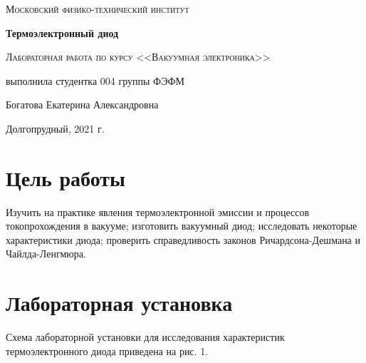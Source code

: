 \documentclass[a4paper]{article}
\begin{document}
\begin{titlepage}
	\centering
	\vspace{5cm}
	{\scshape\LARGE Московский физико-технический институт \par}
	\vspace{5cm}

	{\huge\bfseries Термоэлектронный диод \par}
	\vspace{1cm}
	{\scshape\Large Лабораторная работа по курсу <<Вакуумная электроника>>\par}
	\vspace{1cm}
	\vfill
\begin{flushright}
	{\large выполнила студентка 004 группы ФЭФМ}\par
	\vspace{0.3cm}
	{\LARGE Богатова Екатерина Александровна} \par

	
\end{flushright}
	

	\vfill

	Долгопрудный, 2021 г.
\end{titlepage}

\section{Цель работы}
Изучить на практике явления термоэлектронной эмиссии и процессов токопрохождения в вакууме; изготовить вакуумный диод; исследовать некоторые характеристики диода; проверить справедливость законов Ричардсона-Дешмана и Чайлда-Ленгмюра.

\section{Лабораторная установка}
Схема лабораторной установки для исследования характеристик термоэлектронного диода приведена на рис. 1.
\end{document}
